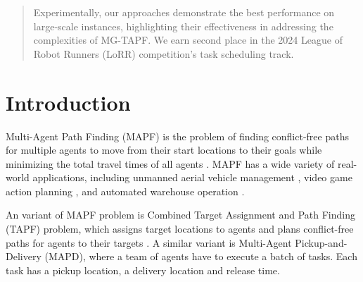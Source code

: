 \documentclass[letterpaper]{article} %
\begin{document}
\begin{abstract}
Experimentally, our approaches demonstrate the best performance on large-scale instances, highlighting their effectiveness in addressing the complexities of MG-TAPF.
We earn second place in the 2024 League of Robot Runners (LoRR) competition's task scheduling track. 

\end{abstract}

%

\section{Introduction}

Multi-Agent Path Finding (MAPF) is the problem of finding conflict-free paths for multiple agents to move from their start locations to their goals while minimizing the total travel times of all agents \cite{stern2019mapf}. 
MAPF has a wide variety of real-world applications, 
including unmanned aerial vehicle management \cite{ho2019multi}, video game action planning \cite{ma2017feasibility}, and automated warehouse operation \cite{li2021lifelong, varambally2022mapf}. 

An variant of MAPF problem is Combined Target Assignment and Path Finding (TAPF) problem, 
which assigns target locations to agents and plans conflict-free paths for agents to their targets \cite{ma2016optimal}. 
A similar variant is Multi-Agent Pickup-and-Delivery (MAPD), where a team of agents have to execute a batch of tasks. 
Each task has a pickup location, a delivery location and release time. 
\end{document}
